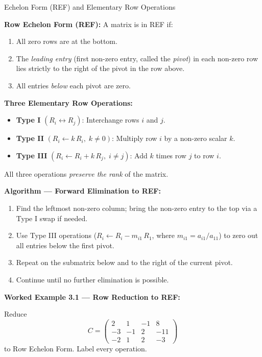 \documentclass[12pt,a4paper]{article}
\begin{document}
\begin{infobox}{Echelon Form (REF) and Elementary Row Operations}

\textbf{Row Echelon Form (REF):} A matrix is in REF if:
\begin{enumerate}
  \item All zero rows are at the bottom.
  \item The \emph{leading entry} (first non-zero entry, called the \emph{pivot}) in each non-zero row
        lies strictly to the right of the pivot in the row above.
  \item All entries \emph{below} each pivot are zero.
\end{enumerate}

\textbf{Three Elementary Row Operations:}
\begin{itemize}
  \item \textbf{Type I} $(R_i \leftrightarrow R_j)$: Interchange rows $i$ and $j$.
  \item \textbf{Type II} $(R_i \leftarrow k\,R_i,\; k\neq0)$: Multiply row $i$ by a non-zero scalar $k$.
  \item \textbf{Type III} $(R_i \leftarrow R_i + k\,R_j,\; i\neq j)$: Add $k$ times row $j$ to row $i$.
\end{itemize}

All three operations \emph{preserve the rank} of the matrix.

\textbf{Algorithm --- Forward Elimination to REF:}
\begin{enumerate}[label=\arabic*.]
  \item Find the leftmost non-zero column; bring the non-zero entry to the top via a Type I swap if needed.
  \item Use Type III operations ($R_i \leftarrow R_i - m_{i1}\,R_1$, where $m_{i1} = a_{i1}/a_{11}$) to zero out all entries below the first pivot.
  \item Repeat on the submatrix below and to the right of the current pivot.
  \item Continue until no further elimination is possible.
\end{enumerate}
\end{infobox}

\textbf{Worked Example 3.1 --- Row Reduction to REF:}

Reduce
\[
C = \begin{pmatrix} 2 & 1 & -1 & 8 \\ -3 & -1 & 2 & -11 \\ -2 & 1 & 2 & -3 \end{pmatrix}
\]
to Row Echelon Form. Label every operation.
\end{document}
